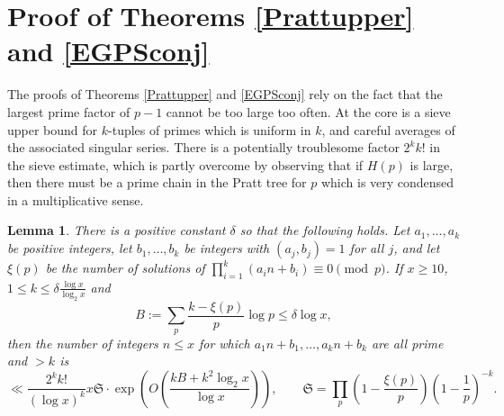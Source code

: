 \documentclass[12pt]{amsart}
\theoremstyle{remark}
\theoremstyle{plain}
\newtheorem{lem}{Lemma}[section]
\numberwithin{equation}{section}
\renewcommand{\SS}{\mathfrak{S}}  %
\renewcommand{\(}{\left(}
\renewcommand{\)}{\right)}
\newcommand{\pfrac}[2]{\left(\frac{#1}{#2}\right)}
\renewcommand{\le}{\leqslant}
\renewcommand{\ge}{\geqslant}
\begin{document}
%
%
%
\section{Proof of Theorems \ref{Prattupper} and \ref{EGPSconj}}\label{sec:Prattupper}
%
%
%

The proofs of Theorems \ref{Prattupper} and \ref{EGPSconj} rely on the fact
that the largest prime factor of $p-1$ cannot be too large
too often.   At the core is a sieve upper bound for $k$-tuples of
primes which is uniform in $k$, and careful averages of the associated
singular series.  There is a potentially troublesome factor $2^k k!$ in
the sieve estimate, which is partly overcome by observing that
if $H(p)$ is large, then there must be a prime chain in the Pratt
tree for $p$ which is very condensed in a multiplicative sense.

%
%

\begin{lem}\label{sieve}
There is a positive constant $\delta$ so that the following holds.
Let $a_1,\ldots,a_k$ be positive integers, let $b_1,\ldots,b_k$ be
integers with $(a_j,b_j)=1$ for all $j$, 
and let $\xi(p)$ be the number of solutions of
$\prod_{i=1}^k (a_i n+b_i) \equiv 0\pmod{p}$.
If $x\ge 10$, $1\le k\le \delta \frac{\log x}{\log_2 x}$ and
\[
B := \sum_{p} \frac{k-\xi(p)}{p}\log p \le \delta \log x,
\]
then the number of integers $n\le x$ for which $a_1 n + b_1,
\ldots, a_k n + b_k$ are all prime and $>k$ is
\[
\ll \frac{2^k k!}{(\log x)^k} x \SS \cdot \exp \( O\pfrac{kB+k^2\log_2
  x}{\log x} \), \qquad
\SS=\prod_{p} \( 1 - \frac{\xi(p)}{p}\) \(1 - \frac{1}{p}\)^{-k}.
\]
\end{lem}
\end{document}

